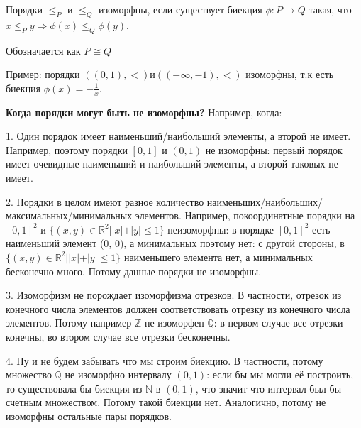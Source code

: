 Порядки $\le_P$ и $\le_Q$ изоморфны, если существует биекция $\phi: P \rightarrow Q$ такая, что $x \le_P y \Rightarrow \phi(x) \le_Q \phi(y)$.

Обозначается как $P \cong Q$

Пример: порядки $((0, 1), <) и ((-\infty, -1), <)$ изоморфны, т.к есть биекция $\phi(x) = -\frac{1}{x}$.

\textbf{Когда порядки могут быть не изоморфны?} Например, когда:

\hspace{0.5cm}\parbox{15cm} {
    1. Один порядок имеет наименьший/наибольший элементы, а второй не имеет. Например, поэтому порядки $[0, 1]$ и $(0, 1)$ не изоморфны: первый порядок имеет очевидные наименьший и наибольший элементы, а второй таковых не имеет.

    2. Порядки в целом имеют разное количество наименьших/наибольших/максимальных/минимальных элементов. Например, покоординатные порядки на $[0, 1]^2$ и $\{(x, y) \in \mathbb{R}^2 | |x| + |y| \le 1\}$ неизоморфны: в порядке $[0, 1]^2$ есть наименьший элемент (0, 0), а минимальных поэтому нет: с другой стороны, в $\{(x, y) \in \mathbb{R}^2 | |x| + |y| \le 1\}$ наименьшего элемента нет, а минимальных бесконечно много. Потому данные порядки не изоморфны.

    3. Изоморфизм не порождает изоморфизма отрезков. В частности, отрезок из конечного числа элементов должен соответствовать отрезку из конечного числа элементов. Потому например $\mathbb{Z}$ не изоморфен $\mathbb{Q}$: в первом случае все отрезки конечны, во втором случае все отрезки бесконечны.

    4. Ну и не будем забывать что мы строим биекцию. В частности, потому множество $\mathbb{Q}$ не изоморфно интервалу $(0, 1)$: если бы мы могли её построить, то существовала бы биекция из $\mathbb{N}$ в $(0, 1)$, что значит что интервал был бы счетным множеством. Потому такой биекции нет. Аналогично, потому не изоморфны остальные пары порядков.

 }
